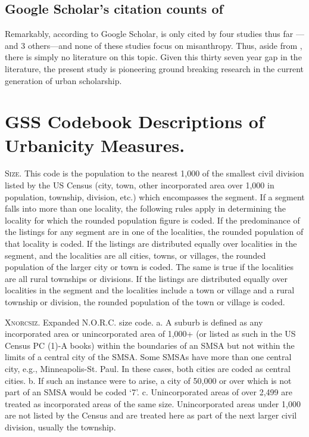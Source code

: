 \documentclass[11pt, letterpaper]{article}
\begin{document}
\begin{spacing}{1.4}
\subsection{Google Scholar's citation counts of  \citet{wilson85}}

Remarkably, according to Google Scholar, \citet{wilson85} is only cited by four studies thus far
---\citet{smith97} and 3 others---and none of these studies focus on
misanthropy. Thus, aside from \citet{wilson85}, there is simply no literature on
this topic. Given this thirty seven year gap in the literature, the present study is pioneering ground breaking research in the current generation of urban scholarship.

\section{GSS Codebook Descriptions of Urbanicity Measures.}   

\textsc{Size}. This code is the population to the nearest 1,000 of the smallest civil
division listed by the US Census (city, town, other incorporated
area over 1,000 in population, township, division, etc.) which
encompasses the segment. If a segment falls into more than one
locality, the following rules apply in determining the locality for
which the rounded population figure is coded.
If the predominance of the listings for any segment are in one of the
localities, the rounded population of that locality is coded.
If the listings are distributed equally over localities in the
segment, and the localities are all cities, towns, or villages, the
rounded population of the larger city or town is coded. The same is
true if the localities are all rural townships or divisions.
If the listings are distributed equally over localities in the segment
and the localities include a town or village and a rural township or
division, the rounded population of the town or village is coded.

\textsc{Xnorcsiz}. Expanded N.O.R.C. size code. 
a. A suburb is defined as any incorporated area or unincorporated area
of 1,000+ (or listed as such in the US Census PC (1)-A books) within
the boundaries of an SMSA but not within the limits of a central city
of the SMSA. Some SMSAs have more than one central city, e.g.,
Minneapolis-St. Paul. In these cases, both cities are coded as central
cities.
b. If such an instance were to arise, a city of 50,000 or over which is
not part of an SMSA would be coded `7'.
c. Unincorporated areas of over 2,499 are treated as incorporated areas
of the same size. Unincorporated areas under 1,000 are not listed by
the Census and are treated here as part of the next larger civil
division, usually the township.


\end{spacing}
\end{document}

